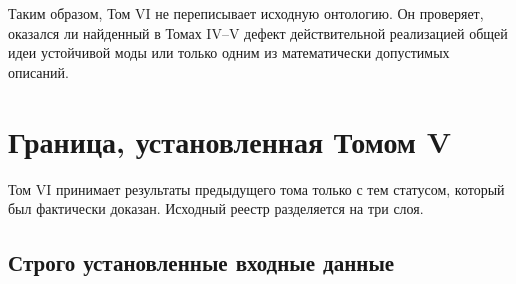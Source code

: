 Таким образом, Том VI не переписывает исходную онтологию. Он проверяет,
оказался ли найденный в Томах IV--V дефект действительной реализацией
общей идеи устойчивой моды или только одним из математически допустимых
описаний.

\section{Граница, установленная Томом V}

Том VI принимает результаты предыдущего тома только с тем статусом,
который был фактически доказан. Исходный реестр разделяется на три слоя.

\subsection{Строго установленные входные данные}

